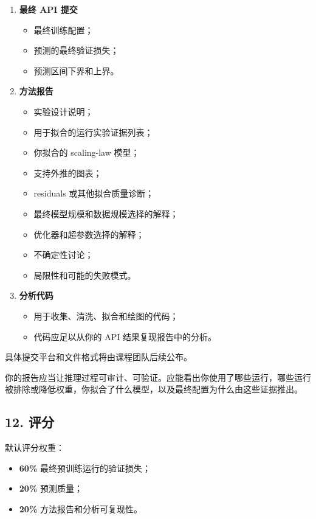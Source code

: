 \documentclass[
  11pt,
]{ctexart}
\providecommand{\tightlist}{%
  \setlength{\itemsep}{0pt}\setlength{\parskip}{0pt}}
\begin{document}
\begin{enumerate}
\def\labelenumi{\arabic{enumi}.}
\tightlist
\item
  \textbf{最终 API 提交}

  \begin{itemize}
  \tightlist
  \item
    最终训练配置；
  \item
    预测的最终验证损失；
  \item
    预测区间下界和上界。
  \end{itemize}
\item
  \textbf{方法报告}

  \begin{itemize}
  \tightlist
  \item
    实验设计说明；
  \item
    用于拟合的运行实验证据列表；
  \item
    你拟合的 scaling-law 模型；
  \item
    支持外推的图表；
  \item
    residuals 或其他拟合质量诊断；
  \item
    最终模型规模和数据规模选择的解释；
  \item
    优化器和超参数选择的解释；
  \item
    不确定性讨论；
  \item
    局限性和可能的失败模式。
  \end{itemize}
\item
  \textbf{分析代码}

  \begin{itemize}
  \tightlist
  \item
    用于收集、清洗、拟合和绘图的代码；
  \item
    代码应足以从你的 API 结果复现报告中的分析。
  \end{itemize}
\end{enumerate}

具体提交平台和文件格式将由课程团队后续公布。

你的报告应当让推理过程可审计、可验证。应能看出你使用了哪些运行，哪些运行被排除或降低权重，你拟合了什么模型，以及最终配置为什么由这些证据推出。

\hypertarget{ux8bc4ux5206}{%
\subsection{12. 评分}\label{ux8bc4ux5206}}

默认评分权重：

\begin{itemize}
\tightlist
\item
  \textbf{60\%} 最终预训练运行的验证损失；
\item
  \textbf{20\%} 预测质量；
\item
  \textbf{20\%} 方法报告和分析可复现性。
\end{itemize}
\end{document}
